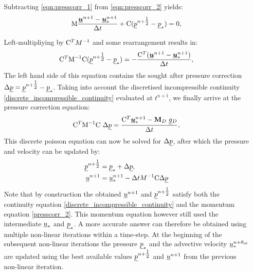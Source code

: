 Subtracting \eqref{eqn:presscorr_1} from \eqref{eqn:presscorr_2} yields:
\begin{equation}\label{eqn:presscorr_substract}
\mathrm{M}  \frac{{\underline{{\mbox{\boldmath$u$}}}^{n+1}-\underline{{\mbox{\boldmath$u$}}}_*^{n+1}}}{\Delta t}
    + \mathrm{C} ( \underline{p}^{n+\tfrac 12} - \underline{p}_*)
    =0,
\end{equation}

Left-multipliying by $\mathrm{C}^TM^{-1}$ and 
some rearrangement results in:
\begin{equation*}
  \mathrm{C}^T \mathrm{M^{-1}}\mathrm{C} ( \underline{p}^{n+\tfrac 12} -  \underline{p}_*)
  =-\frac{\mathrm{C}^T  ({\underline{{\mbox{\boldmath$u$}}}^{n+1}-\underline{{\mbox{\boldmath$u$}}}_*^{n+1}})}{\Delta t},
\end{equation*}
The left hand side of this equation contains the sought after pressure 
correction $\Delta\underline{p}=\underline{p}^{n+\tfrac 12}-\underline{p}_*$. 
Taking into account the discretised incompressible continuity 
\eqref{discrete_incompressible_continuity} evaluated at 
$t^{n+1}$, we finally arrive at the pressure correction equation:
\begin{equation}
 \mathrm{C}^T \mathrm{M^{-1}}\mathrm{C}~\Delta\underline{p}
   =\frac{ \mathrm{C}^T \underline{{\mbox{\boldmath$u$}}}_*^{n+1}-{\mbox{\boldmath$\mathrm{M}$}}_D ~\underline{g}{}_D}{\Delta t},
   \label{eqn:pressure_correction}
\end{equation}
This discrete poisson equation can now be solved 
for $\Delta\underline{p}$, after which the pressure and velocity can 
be updated by:
\begin{equation*}
\begin{split}
  \underline{p}^{n+\tfrac 12} &= \underline{p}_* + \Delta\underline{p}, \\
  \underline{u}^{n+1} &= \underline{u}_*^{n+1}
  -\Delta t  M^{-1} \mathrm{C} \Delta\underline{p}
\end{split}
\end{equation*}
Note that by construction the obtained $\underline{u}^{n+1}$ and 
$\underline{p}^{n+\tfrac 12}$ satisfy both the continuity equation
\eqref{discrete_incompressible_continuity} and the momentum equation
\eqref{presscorr_2}. This momentum equation however still used
the intermediate $\underline{u}_*$ and $\underline{p}_*$.
A more accurate answer can therefore 
be obtained using multiple non-linear iterations within a 
time-step. At the beginning of the subsequent non-linear iterations
the pressure $\underline{p}_*$ and the advective velocity 
$\underline{u}_*^{n+\theta_{\mathrm{nl}}}$ are updated using the best available values
$\underline{p}^{n+\tfrac 12}$ and $\underline{u}^{n+1}$ from the previous 
non-linear iteration.

